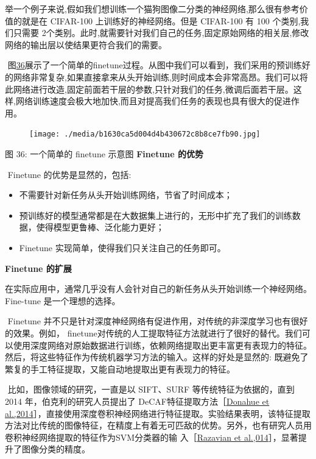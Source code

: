 ​
举一个例子来说,假如我们想训练一个猫狗图像二分类的神经网络,那么很有参考价值的就是在
CIFAR-100 上训练好的神经网络。但是 CIFAR-100 有 100 个类别,我们只需要
2个类别。此时,就需要针对我们自己的任务,固定原始网络的相关层,修改网络的输出层以使结果更符合我们的需要。

​
图\protect\hyperlink{bookmark148}{36}展示了一个简单的finetune过程。从图中我们可以看到，我们采用的预训练好的网络非常复杂,如果直接拿来从头开始训练,则时间成本会非常高昂。我们可以将此网络进行改造,固定前面若干层的参数,只针对我们的任务,微调后面若干层。这样,网络训练速度会极大地加快,而且对提高我们任务的表现也具有很大的促进作用。

\begin{figure}
\centering
\texttt{[image: ./media/b1630ca5d004d4b430672c8b8ce7fb90.jpg]}
\caption{}
\end{figure}

图 36: 一个简单的 finetune 示意图 \textbf{Finetune 的优势}

​ Finetune 的优势是显然的，包括:

\begin{itemize}
\tightlist
\item
  不需要针对新任务从头开始训练网络，节省了时间成本；
\item
  预训练好的模型通常都是在大数据集上进行的，无形中扩充了我们的训练数据，使得模型更鲁棒、泛化能力更好；
\item
  Finetune 实现简单，使得我们只关注自己的任务即可。
\end{itemize}

\textbf{Finetune 的扩展}

​
在实际应用中，通常几乎没有人会针对自己的新任务从头开始训练一个神经网络。Fine-tune
是一个理想的选择。

​ Finetune
并不只是针对深度神经网络有促进作用，对传统的非深度学习也有很好的效果。例如，
finetune对传统的人工提取特征方法就进行了很好的替代。我们可以使用深度网络对原始数据进行训练，依赖网络提取出更丰富更有表现力的特征。然后，将这些特征作为传统机器学习方法的输入。这样的好处是显然的:
既避免了繁复的手工特征提取，又能自动地提取出更有表现力的特征。

​ 比如，图像领域的研究，一直是以 SIFT、SURF 等传统特征为依据的，直到
2014 年，伯克利的研究人员提出了
DeCAF特征提取方法［\protect\hyperlink{bookmark246}{Donahue et
al.,2014}］，直接使用深度卷积神经网络进行特征提取。实验结果表明，该特征提取方法对比传统的图像特征，在精度上有着无可匹敌的优势。另外，也有研究人员用卷积神经网络提取的特征作为SVM分类器的输
入［\protect\hyperlink{bookmark291}{Razavian et
al.,014}］，显著提升了图像分类的精度。

